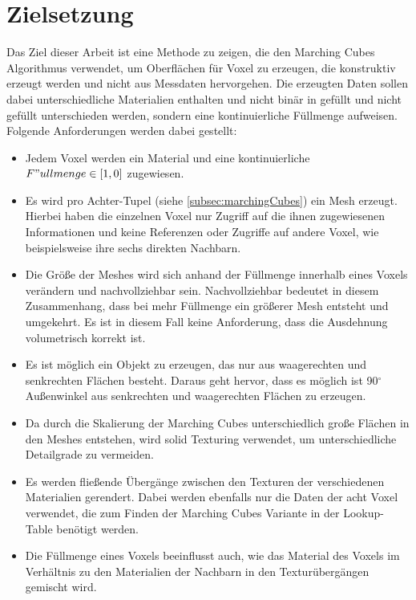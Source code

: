 
\section{Zielsetzung}
\label{sec:zielsetzung}
Das Ziel dieser Arbeit ist eine Methode zu zeigen, die den Marching Cubes Algorithmus verwendet, um Oberflächen für Voxel zu erzeugen, die konstruktiv erzeugt werden und nicht aus Messdaten hervorgehen. Die erzeugten Daten sollen dabei unterschiedliche Materialien enthalten und nicht binär in gefüllt und nicht gefüllt unterschieden werden, sondern eine kontinuierliche Füllmenge aufweisen. Folgende Anforderungen werden dabei gestellt:
\begin{itemize}
\item Jedem Voxel werden ein Material und eine kontinuierliche $F"ullmenge \in [1,0]$ zugewiesen. 
\item Es wird pro Achter-Tupel (siehe \ref{subsec:marchingCubes}) ein Mesh erzeugt. Hierbei haben die einzelnen Voxel nur Zugriff auf die ihnen zugewiesenen Informationen und keine Referenzen oder Zugriffe auf andere Voxel, wie beispielsweise ihre sechs direkten Nachbarn.
\item Die Größe der Meshes wird sich anhand der Füllmenge innerhalb eines Voxels verändern und nachvollziehbar sein. Nachvollziehbar bedeutet in diesem Zusammenhang, dass bei mehr Füllmenge ein größerer Mesh entsteht und umgekehrt. Es ist in diesem Fall keine Anforderung, dass die Ausdehnung volumetrisch korrekt ist.
\item Es ist möglich ein Objekt zu erzeugen, das nur aus waagerechten und senkrechten Flächen besteht. Daraus geht hervor, dass es möglich ist 90$^\circ$ Außenwinkel aus senkrechten und waagerechten Flächen zu erzeugen.
\item Da durch die Skalierung der Marching Cubes unterschiedlich große Flächen in den Meshes entstehen, wird solid Texturing verwendet, um unterschiedliche Detailgrade zu vermeiden.
\item Es werden fließende Übergänge zwischen den Texturen der verschiedenen Materialien gerendert. Dabei werden ebenfalls nur die Daten der acht Voxel verwendet, die zum Finden der Marching Cubes Variante in der Lookup-Table benötigt werden.
\item Die Füllmenge eines Voxels beeinflusst auch, wie das Material des Voxels im Verhältnis zu den Materialien der Nachbarn in den Texturübergängen gemischt wird.
\end{itemize}